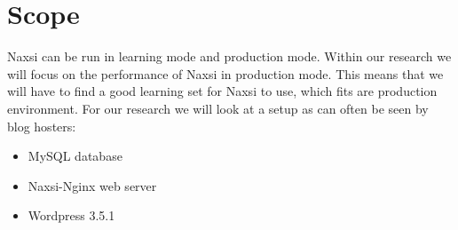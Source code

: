 \documentclass[Scope]{subfiles}
\begin{document}
\section{Scope}
\label{sec:scope}
Naxsi can be run in learning mode and production mode. Within our research we will focus on the performance of Naxsi in production mode. This means that we will have to find a good learning set for Naxsi to use, which fits are production environment. For our research we will look at a setup as can often be seen by blog hosters:
\begin{itemize}
\item MySQL database
\item Naxsi-Nginx web server
\item Wordpress 3.5.1
\end{itemize}
\end{document}
